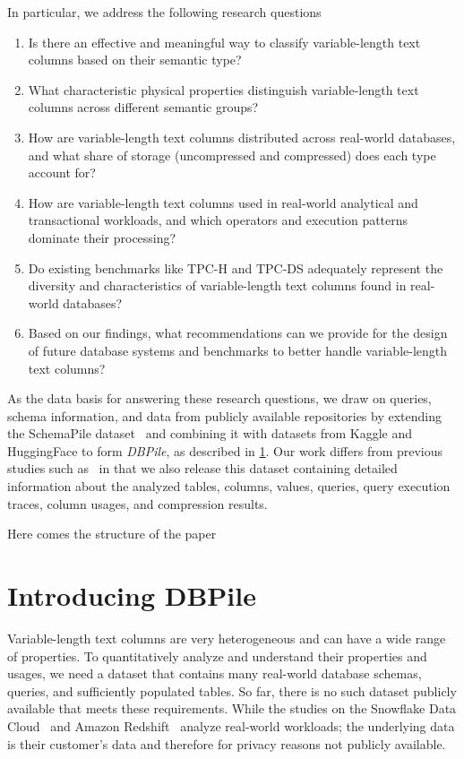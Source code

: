 In particular, we address the following research questions



\begin{enumerate}
    \item[(RQ1)] Is there an effective and meaningful way to classify variable-length text columns based on their semantic type?
    \item[(RQ2)] What characteristic physical properties distinguish variable-length text columns across different semantic groups?
    \item[(RQ3)] How are variable-length text columns distributed across real-world databases, and what share of storage (uncompressed and compressed) does each type account for?
    \item[(RQ4)] How are variable-length text columns used in real-world analytical and transactional workloads, and which operators and execution patterns dominate their processing?
    \item[(RQ5)] Do existing benchmarks like TPC-H and TPC-DS adequately represent the diversity and characteristics of variable-length text columns found in real-world databases?
    \item[(RQ6)] Based on our findings, what recommendations can we provide for the design of future database systems and benchmarks to better handle variable-length text columns?
\end{enumerate}

As the data basis for answering these research questions, we draw on queries, schema information, and data from
publicly available repositories by extending the SchemaPile dataset~\cite{dohmen_schemapile_2024} and combining it with
datasets from Kaggle and HuggingFace to form \textit{DBPile}, as described in \cref{sec:data-collection}.
Our work differs from previous studies such as~\cite{van_renen_why_2024, vogelsgesang_get_2018, szlang_workload_2025}
in that we also release this dataset containing detailed information about the analyzed tables, columns, values, queries,
query execution traces, column usages, and compression results.

Here comes the structure of the paper

\section{Introducing DBPile}\label{sec:data-collection}

Variable-length text columns are very heterogeneous and can have a wide range of properties.
To quantitatively analyze and understand their properties and usages, we need a dataset that contains many
real-world database schemas, queries, and sufficiently populated tables.
So far, there is no such dataset publicly available that meets these requirements.
While the studies on the Snowflake Data Cloud~\cite{szlang_workload_2025} and Amazon Redshift~\cite{van_renen_why_2024}
analyze real-world workloads; the underlying data is their customer's data and therefore for privacy reasons
not publicly available.

